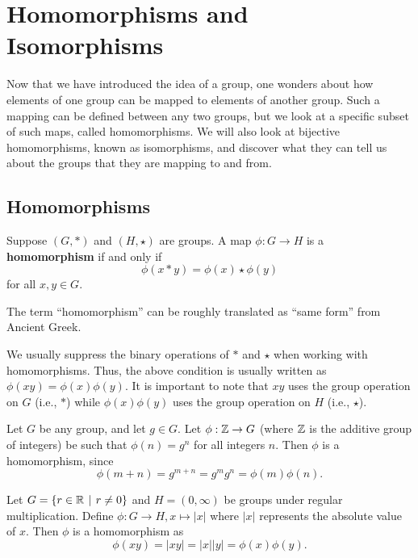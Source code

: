 \chapter{Homomorphisms and Isomorphisms}
Now that we have introduced the idea of a group, one wonders about how elements of one group can be mapped to elements of another group. Such a mapping can be defined between any two groups, but we look at a specific subset of such maps, called homomorphisms. We will also look at bijective homomorphisms, known as isomorphisms, and discover what they can tell us about the groups that they are mapping to and from.

\section{Homomorphisms}
\begin{definition}
    Suppose $(G, \ast)$ and $(H, \star)$ are groups. A map $\phi: G \to H$ is a \textbf{homomorphism} if and only if
    \[
        \phi(x \ast y) = \phi(x) \star \phi(y)
    \]
    for all $x, y \in G$.
\end{definition}
\begin{remark}
    The term ``homomorphism'' can be roughly translated as ``same form'' from Ancient Greek.
\end{remark}
\begin{remark}
    We usually suppress the binary operations of $\ast$ and $\star$ when working with homomorphisms. Thus, the above condition is usually written as $\phi(xy) = \phi(x)\phi(y)$. It is important to note that $xy$ uses the group operation on $G$ (i.e., $\ast$) while $\phi(x)\phi(y)$ uses the group operation on $H$ (i.e., $\star$).
\end{remark}

\begin{example}
    Let $G$ be any group, and let $g \in G$. Let $\phi: \mathbb{Z} \to G$ (where $\mathbb{Z}$ is the additive group of integers) be such that $\phi(n) = g^n$ for all integers $n$. Then $\phi$ is a homomorphism, since
    \[
        \phi(m + n) = g^{m+n} = g^m g^n = \phi(m)\phi(n).
    \]
\end{example}

\begin{example}
    Let $G = \{r \in \R \vert r \neq 0\}$ and $H = (0, \infty)$ be groups under regular multiplication. Define $\phi: G \to H, x \mapsto |x|$ where $|x|$ represents the absolute value of $x$. Then $\phi$ is a homomorphism as
    \[
        \phi(xy) = |xy| = |x||y| = \phi(x)\phi(y).
    \]
\end{example}

